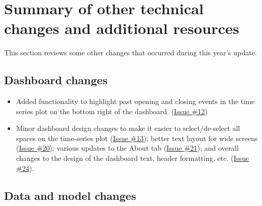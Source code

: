 \documentclass[
  11pt,
]{article}
\providecommand{\tightlist}{%
  \setlength{\itemsep}{0pt}\setlength{\parskip}{0pt}}
\begin{document}
\hypertarget{summary-of-other-technical-changes-and-additional-resources}{%
\section{Summary of other technical changes and additional
resources}\label{summary-of-other-technical-changes-and-additional-resources}}

This section reviews some other changes that occurred during this year's
update.

\hypertarget{dashboard-changes}{%
\subsection{Dashboard changes}\label{dashboard-changes}}

\begin{itemize}
\tightlist
\item
  Added functionality to highlight past opening and closing events in
  the time series plot on the bottom right of the dashboard.
  (\href{https://github.com/vdeminstitute/demspaces/issues/12}{Issue
  \#12})
\item
  Minor dashboard design changes to make it easier to select/de-select
  all spaces on the time-series plot
  (\href{https://github.com/vdeminstitute/demspaces/issues/13}{Issue
  \#13}); better text layout for wide screens
  (\href{https://github.com/vdeminstitute/demspaces/issues/20}{Issue
  \#20}); various updates to the About tab
  (\href{https://github.com/vdeminstitute/demspaces/issues/21}{Issue
  \#21}); and overall changes to the design of the dashboard text,
  header formatting, etc.
  (\href{https://github.com/vdeminstitute/demspaces/issues/24}{Issue
  \#24}).
\end{itemize}

\hypertarget{data-and-model-changes}{%
\subsection{Data and model changes}\label{data-and-model-changes}}
\end{document}
